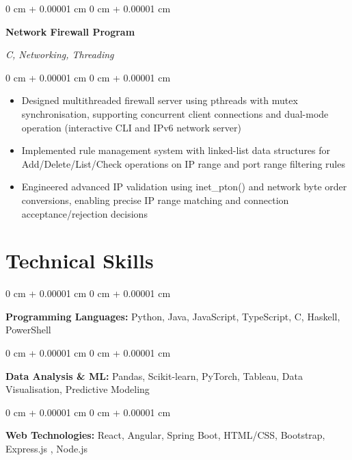 \documentclass[10pt, a4paper]{article}
\newenvironment{highlights}{
    \begin{itemize}[
        topsep=0.10 cm,
        parsep=0.10 cm,
        partopsep=0pt,
        itemsep=0pt,
        leftmargin=20pt
    ]
}{
    \end{itemize}
} %
\newenvironment{onecolentry}{
    \begin{adjustwidth}{
        0 cm + 0.00001 cm
    }{
        0 cm + 0.00001 cm
    }
}{
    \end{adjustwidth}
} %
\newenvironment{twocolentry}[2][]{
    \onecolentry
    \def\secondColumn{#2}
    \setcolumnwidth{\fill, 4.5 cm}
    \begin{paracol}{2}
}{
    \switchcolumn \raggedleft \secondColumn
    \end{paracol}
    \endonecolentry
} %
\begin{document}
    \vspace{0.2 cm}

    \begin{twocolentry}{
        \textit{C, Networking, Threading}
    }
        \textbf{Network Firewall Program}
    \end{twocolentry}

    \vspace{0.10 cm}
    \begin{onecolentry}
        \begin{highlights}
            \item Designed multithreaded firewall server using pthreads with mutex synchronisation, supporting concurrent client connections and dual-mode operation (interactive CLI and IPv6 network server)
            \item Implemented rule management system with linked-list data structures for Add/Delete/List/Check operations on IP range and port range filtering rules
            \item Engineered advanced IP validation using inet\_pton() and network byte order conversions, enabling precise IP range matching and connection acceptance/rejection decisions
        \end{highlights}
    \end{onecolentry}

    \section{Technical Skills}

    \begin{onecolentry}
        \textbf{Programming Languages:} Python, Java, JavaScript, TypeScript, C, Haskell, PowerShell
    \end{onecolentry}

    \vspace{0.2 cm}

    \begin{onecolentry}
        \textbf{Data Analysis \& ML:} Pandas, Scikit-learn, PyTorch, Tableau, Data Visualisation, Predictive Modeling
    \end{onecolentry}

    \vspace{0.2 cm}

    \begin{onecolentry}
        \textbf{Web Technologies:} React, Angular, Spring Boot, HTML/CSS, Bootstrap, Express.js , Node.js
    \end{onecolentry}
\end{document}
